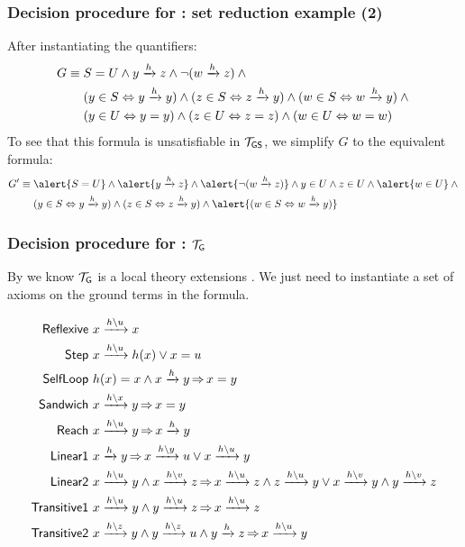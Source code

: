\documentclass{beamer}
\begin{document}
\begin{frame}
  \frametitle{Decision procedure for \LRJQ: set reduction example (2)}
After instantiating the quantifiers:
\begin{align*}
G \equiv {} & S = 
U \land \reach{y}{z} \land \neg (\reach{w}{z}) \land {} \\
& (y \in S \Leftrightarrow \reach{y}{y}) \land (z \in S \Leftrightarrow \reach{z}{y}) \land (w \in S \Leftrightarrow \reach{w}{y}) \land {} \\
& (y \in U \Leftrightarrow y = y) \land (z \in U \Leftrightarrow z = z) \land (w \in U \Leftrightarrow w = w)
\end{align*}
To see that this formula is unsatisfiable in $\lrjqtheory$, we simplify $G$ to the equivalent formula:
\begin{align*}
G' \equiv {} & \alert{S = U} \land \alert{\reach{y}{z}} \land \alert{\neg (\reach{w}{z})} \land y \in U \land z \in U \land \alert{w \in U} \land {}\\
& (y \in S \Leftrightarrow \reach{y}{y}) \land (z \in S \Leftrightarrow \reach{z}{y}) \land \alert{(w \in S \Leftrightarrow \reach{w}{y})}
\end{align*}

\end{frame}

\begin{frame}
  \frametitle{Decision procedure for \LRJQ: $\graphtheory$}
  
  By \cite{TotlaWies13CompleteInsterpolation} we know $\graphtheory$ is a local theory extensions \cite{SofronieStokkermans05HierarchicReasoninginLocalTheoryExtensions}.
  We just need to instantiate a set of axioms on the ground terms in the formula.

{\scriptsize
  \begin{align*}
    \textsf{Reflexive } & \creach{x}{x}{u}\\
    \textsf{Step } & \creach{x}{h(x)}{u} \lor x = u\\
    \textsf{SelfLoop } & h(x)=x \land \reach{x}{y} \mimplies x = y\\
    \textsf{Sandwich } & \creach{x}{y}{x} \mimplies x = y\\
    \textsf{Reach } & \creach{x}{y}{u} \mimplies \reach{x}{y}\\
    \textsf{Linear1 } & \reach{x}{y} \mimplies \creach{x}{u}{y} \lor \creach{x}{y}{u}\\
    \textsf{Linear2 } & \creach{x}{y}{u} \land \creach{x}{z}{v} \mimplies \creach{x}{z}{u} \land \creach{z}{y}{u} \lor \creach{x}{y}{v} \land \creach{y}{z}{v} \\
    \textsf{Transitive1 } & \creach{x}{y}{u} \land \creach{y}{z}{u} \mimplies     \creach{x}{z}{u}\\
    \textsf{Transitive2 } & \creach{x}{y}{z} \land \creach{y}{u}{z} \land \reach{y}{z} \mimplies    \creach{x}{y}{u}
  \end{align*}
}

\end{frame}
\end{document}
